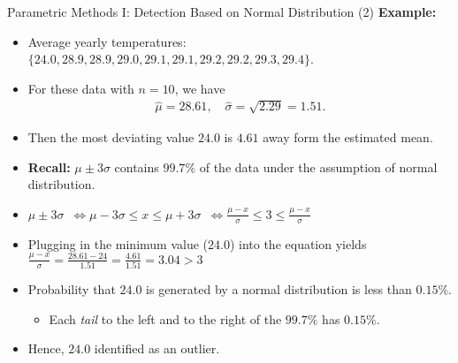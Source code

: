 \begin{frame}{Parametric Methods I: Detection Based on Normal Distribution (2)}
	\textbf{Example:}
	\begin{itemize}
		\item Average yearly temperatures: $\{24.0, 28.9, 28.9, 29.0, 29.1, 29.1, 29.2, 29.2, 29.3, 29.4\}$.
		\item For these data with $n = 10$, we have
		      \begin{align}
			      \widehat{\mu}=28.61, \quad \widehat{\sigma}=\sqrt{2.29}=1.51.
		      \end{align}
		\item Then the most deviating value $24.0$ is $4.61$ away form the estimated mean.
		\item \textbf{Recall:} $\mu \pm 3\sigma $ contains $99.7\%$ of the data under the assumption of normal distribution.
		\item $\mu \pm 3\sigma$\pause~$ \Leftrightarrow \mu - 3\sigma \leq x \le \mu + 3\sigma$\pause~$ \Leftrightarrow \frac{\mu - x}{\sigma} \leq 3 \leq \frac{\mu - x}{\sigma}$
		\item Plugging in the minimum value ($24.0$) into the equation yields $\frac{\mu-x}{\sigma} = \frac{28.61 - 24}{1.51} =\frac{4.61}{1.51}  =  3.04  >  3$
		\item Probability that $24.0$ is generated by a normal distribution is less than $0.15\%$.
		      \begin{itemize}
			      \item Each \emph{tail} to the left and to the right of the $99.7\%$ has $0.15\%$.
		      \end{itemize}
		\item Hence, $24.0$ identified as an outlier.
	\end{itemize}
\end{frame}


